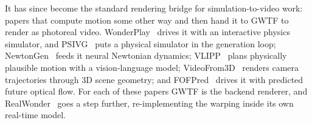 It has since become the standard rendering bridge for simulation-to-video work: papers that compute motion some other way and then hand it to GWTF to render as photoreal video. WonderPlay~\cite{wonderplay2025} drives it with an interactive physics simulator, and PSIVG~\cite{psivg2026} puts a physical simulator in the generation loop; NewtonGen~\cite{newtongen2026} feeds it neural Newtonian dynamics; VLIPP~\cite{vlipp2025} plans physically plausible motion with a vision-language model; VideoFrom3D~\cite{videofrom3d2025} renders camera trajectories through 3D scene geometry; and FOFPred~\cite{fofpred2026} drives it with predicted future optical flow. For each of these papers GWTF is the backend renderer, and RealWonder~\cite{realwonder2026} goes a step further, re-implementing the warping inside its own real-time model.

